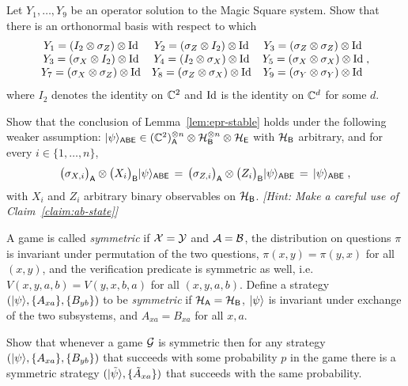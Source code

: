 \chapter{}


\begin{exercise}\label{ex:ms-opsol}
Let $Y_1,\ldots,Y_9$ be an operator solution to the Magic Square system. Show that there is an orthonormal basis with respect to which 
\[ \begin{matrix} Y_1 = (I_2 \otimes \sigma_Z)\otimes \mathop{\rm Id}\nolimits & Y_2 = (\sigma_Z\otimes I_2)\otimes \mathop{\rm Id}\nolimits & Y_3=(\sigma_Z\otimes \sigma_Z)\otimes \mathop{\rm Id}\nolimits \\
Y_3 = (\sigma_X\otimes I_2)\otimes \mathop{\rm Id}\nolimits & Y_4 = (I_2\otimes \sigma_X)\otimes \mathop{\rm Id}\nolimits & Y_5 = (\sigma_X\otimes \sigma_X)\otimes \mathop{\rm Id}\nolimits \\ Y_7 = (\sigma_X\otimes \sigma_Z)\otimes \mathop{\rm Id}\nolimits & Y_8=(\sigma_Z\otimes \sigma_X)\otimes \mathop{\rm Id}\nolimits & Y_9 = (\sigma_Y\otimes \sigma_Y)\otimes \mathop{\rm Id}\nolimits \end{matrix}\;,\]
where $I_2$ denotes the identity on $\mathbb{C}^2$ and $\mathop{\rm Id}\nolimits$ is the identity on $\mathbb{C}^d$ for some $d$.
\end{exercise}

\begin{exercise}
Show that the conclusion of Lemma~\ref{lem:epr-stable} holds under the following weaker assumption: $|\psi\rangle_{{\textsf{ABE}}} \in (\mathbb{C}^2)_{\textsf{A}}^{\otimes n} \otimes \mathcal{H}_{\textsf{B}}^{\otimes n} \otimes \mathcal{H}_{\textsf{E}}$ with $\mathcal{H}_{\textsf{B}}$ arbitrary, and for every $i\in \{1,\ldots, n\}$,
\[\big(\sigma_{X,i}\big)_{\textsf{A}} \otimes \big(X_i\big)_{\textsf{B}} |\psi\rangle_{{\textsf{ABE}}} \,=\, \big(\sigma_{Z,i}\big)_{\textsf{A}} \otimes \big(Z_i\big)_{\textsf{B}} |\psi\rangle_{{\textsf{ABE}}} \,=\,|\psi\rangle_{\textsf{ABE}}\;,\]
with $X_i$ and $Z_i$ arbitrary binary observables on $\mathcal{H}_{\textsf{B}}$. \emph{[Hint: Make a careful use of Claim~\ref{claim:ab-state}]}
\end{exercise}

\begin{exercise}
A game is called \emph{symmetric} if $\mathcal{X}=\mathcal{Y}$ and $\mathcal{A}=\mathcal{B}$, the distribution on questions $\pi$ is invariant under permutation of the two questions, $\pi(x,y)=\pi(y,x)$ for all $(x,y)$, and the verification predicate is symmetric as well, i.e.\ $V(x,y,a,b)=V(y,x,b,a)$ for all $(x,y,a,b)$. Define a strategy $(|\psi\rangle,\{A_{xa}\},\{B_{yb}\})$ to be \emph{symmetric} if $\mathcal{H}_{\textsf{A}}=\mathcal{H}_{\textsf{B}}$, $|\psi\rangle$ is invariant under exchange of the two subsystems, and $A_{xa} = B_{xa}$ for all $x,a$. 

Show that whenever a game $\mathcal{G}$ is symmetric then for any strategy $(|\psi\rangle,\{A_{xa}\},\{B_{yb}\})$ that succeeds with some probability $p$ in the game there is a symmetric strategy $(|\tilde{\psi}\rangle,\{\tilde{A}_{xa}\})$ that succeeds with the same probability. 
\end{exercise}

